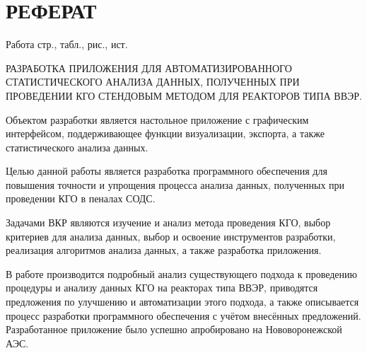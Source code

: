 \documentclass[a4paper,12pt]{article}
\begin{document}
\section*{\centering РЕФЕРАТ}

\thispagestyle{empty} %


Работа  стр.,  табл.,  рис., \totalmycitecounts ист. 

РАЗРАБОТКА ПРИЛОЖЕНИЯ ДЛЯ АВТОМАТИЗИРОВАННОГО СТАТИСТИЧЕСКОГО АНАЛИЗА ДАННЫХ, ПОЛУЧЕННЫХ ПРИ ПРОВЕДЕНИИ КГО СТЕНДОВЫМ МЕТОДОМ ДЛЯ РЕАКТОРОВ ТИПА ВВЭР.

Объектом разработки является настольное приложение с графическим интерфейсом, поддерживающее функции визуализации, экспорта, а также статистического анализа данных.

Целью данной работы является разработка программного обеспечения для повышения точности и упрощения процесса анализа данных, полученных при проведении КГО в пеналах СОДС. 

Задачами ВКР являются изучение и анализ метода проведения КГО, выбор критериев для анализа данных, выбор и освоение инструментов разработки, реализация алгоритмов анализа данных, а также разработка приложения.

В работе производится подробный анализ существующего подхода к проведению процедуры и анализу данных КГО на реакторах типа ВВЭР, приводятся предложения по улучшению и автоматизации этого подхода, а также описывается процесс разработки программного обеспечения с учётом внесённых предложений. Разработанное приложение было успешно апробировано на Нововоронежской АЭС.
\end{document}

